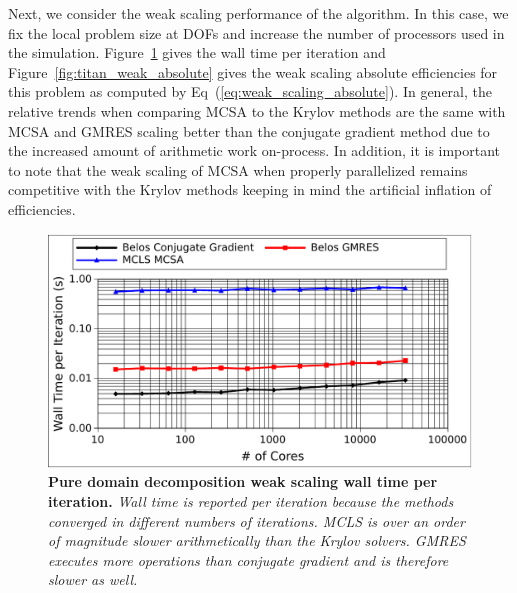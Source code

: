 Next, we consider the weak scaling performance of the algorithm. In
this case, we fix the local problem size at  DOFs and
increase the number of processors used in the
simulation. Figure~\ref{fig:titan_pure_weak_time} gives the wall
time per iteration and Figure~\ref{fig:titan_weak_absolute} gives the
weak scaling absolute efficiencies for this problem as computed by
Eq~(\ref{eq:weak_scaling_absolute}). In general, the relative trends
when comparing MCSA to the Krylov methods are the same with MCSA and
GMRES scaling better than the conjugate gradient method due to the
increased amount of arithmetic work on-process. In addition, it is
important to note that the weak scaling of MCSA when properly
parallelized remains competitive with the Krylov methods keeping in
mind the artificial inflation of efficiencies.

\begin{figure}[t!]
  \begin{center}
    \includegraphics[width=6in]{chapters/parallel_mc/titan_pure_weak_time.pdf}
  \end{center}
  \caption{\textbf{Pure domain decomposition weak scaling wall time
      per iteration.} \textit{Wall time is reported per iteration
      because the methods converged in different numbers of
      iterations. MCLS is over an order of magnitude slower
      arithmetically than the Krylov solvers. GMRES executes more
      operations than conjugate gradient and is therefore slower as
      well.}}
  \label{fig:titan_pure_weak_time}
\end{figure}

